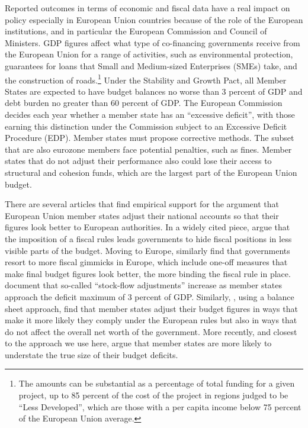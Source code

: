 \documentclass[]{article}
\begin{document}
Reported outcomes in terms of economic and fiscal data have a real impact on policy especially in European Union countries because of the role of the European institutions, and in particular the European Commission and Council of Ministers. GDP figures affect what type of co-financing governments receive from the European Union for a range of activities, such as environmental protection, guarantees for loans that Small and Medium-sized Enterprises (SMEs) take, and the construction of roads.\footnote{The amounts can be substantial as a percentage of total funding for a given project, up to 85 percent of the cost of the project in regions judged to be “Less Developed”, which are those with a per capita income below 75 percent of the European Union average.} Under the Stability and Growth Pact, all Member States are expected to have budget balances no worse than 3 percent of GDP and debt burden no greater than 60 percent of GDP. The European Commission decides each year whether a member state has an ``excessive deficit'', with those earning this distinction under the Commission subject to an Excessive Deficit Procedure (EDP). Member states must propose corrective methods. The subset that are also eurozone members face potential penalties, such as fines. Member states that do not adjust their performance also could lose their access to structural and cohesion funds, which are the largest part of the European Union budget.

There are several articles that find empirical support for the argument that European Union member states adjust their national accounts so that their figures look better to European authorities.  In a widely cited piece, \cite{Milesi-Ferretti2003} argue that the imposition of a fiscal rules leads governments to hide fiscal positions in less visible parts of the budget. Moving to Europe, \cite{KoenNoord2005} similarly find that governments resort to more fiscal gimmicks in Europe, which include one-off measures that make final budget figures look better, the more binding the fiscal rule in place. \cite{vonHagenWolff2006} document that so-called ``stock-flow adjustments'' increase as member states approach the  deficit maximum of 3 percent of GDP.  Similarly, \cite{MilesiMoriyama2006}, using a balance sheet approach, find that member states adjust their budget figures in ways that make it more likely they comply under the European rules but also in ways that do not affect the overall net worth of the government.  More recently, and closest to the approach we use here, \cite{DeCastro2013} argue that member states are more likely to understate the true size of their budget deficits.
\end{document}
